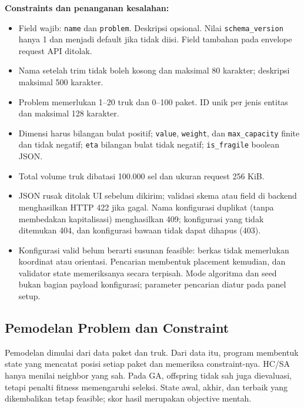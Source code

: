 \documentclass[12pt,a4paper]{article}
\begin{document}
\textbf{Constraints dan penanganan kesalahan:}
\begin{itemize}
    \item Field wajib: \texttt{name} dan \texttt{problem}. Deskripsi opsional. Nilai \texttt{schema\_version} hanya 1 dan menjadi default jika tidak diisi. Field tambahan pada envelope request API ditolak.
    \item Nama setelah trim tidak boleh kosong dan maksimal 80 karakter; deskripsi maksimal 500 karakter.
    \item Problem memerlukan 1--20 truk dan 0--100 paket. ID unik per jenis entitas dan maksimal 128 karakter.
    \item Dimensi harus bilangan bulat positif; \texttt{value}, \texttt{weight}, dan \texttt{max\_capacity} finite dan tidak negatif; \texttt{eta} bilangan bulat tidak negatif; \texttt{is\_fragile} boolean JSON.
    \item Total volume truk dibatasi 100.000 sel dan ukuran request 256 KiB.
    \item JSON rusak ditolak UI sebelum dikirim; validasi skema atau field di backend menghasilkan HTTP 422 jika gagal. Nama konfigurasi duplikat (tanpa membedakan kapitalisasi) menghasilkan 409; konfigurasi yang tidak ditemukan 404, dan konfigurasi bawaan tidak dapat dihapus (403).
    \item Konfigurasi valid belum berarti susunan feasible: berkas tidak memerlukan koordinat atau orientasi. Pencarian membentuk placement kemudian, dan validator state memeriksanya secara terpisah. Mode algoritma dan seed bukan bagian payload konfigurasi; parameter pencarian diatur pada panel setup.
\end{itemize}

\subsection{Pemodelan Problem dan Constraint}
Pemodelan dimulai dari data paket dan truk. Dari data itu, program membentuk state yang mencatat posisi setiap paket dan memeriksa constraint-nya. HC/SA hanya menilai neighbor yang sah. Pada GA, offspring tidak sah juga dievaluasi, tetapi penalti fitness memengaruhi seleksi. State awal, akhir, dan terbaik yang dikembalikan tetap feasible; skor hasil merupakan objective mentah.
\end{document}
